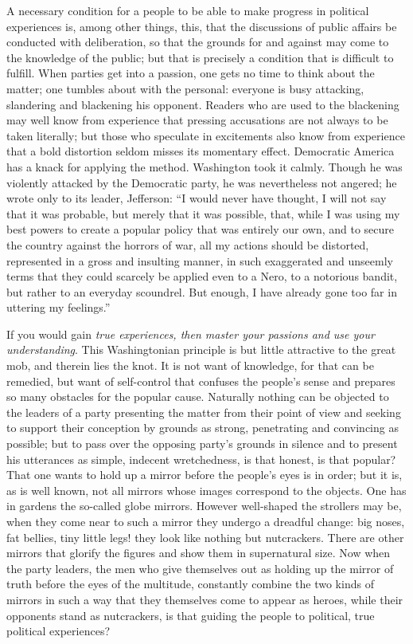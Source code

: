 \documentclass[12pt,a4paper,openany]{book}
\newcommand{\opage}[1]{\marginnote{\footnotesize\textit{[#1]}}}
\begin{document}
A necessary condition for a people to be able to make
progress in political experiences is, among other things, this,
that the discussions of public affairs be conducted
with deliberation, so that the grounds for and against may come
to the knowledge of the public; but that is precisely a condition
that is difficult to fulfill. When parties get
into a passion, one gets no time to think about the matter;
one tumbles about with the personal: everyone is busy
attacking, slandering and blackening his opponent.
Readers who are used to the blackening may well know %
from experience that pressing accusations are not
always to be taken literally; but those who speculate
in excitements also know from experience that a bold
distortion seldom misses its momentary effect.
Democratic America has a knack for applying the
method. Washington took it calmly. Though
he was violently attacked by the Democratic party,
he was nevertheless not angered; he wrote only to its leader,
Jefferson: ``I would never have thought, I will not
say that it was probable, but merely that it was possible,
that, while I was using my best powers to
create a popular policy that was entirely our own, and
to secure the country against the horrors of war, all my actions
should be distorted, represented in a
\setcounter{footnote}{0}%
\opage{48}gross and insulting manner, in such exaggerated and
unseemly terms that they could scarcely be applied
even to a Nero, to a notorious bandit, but rather
to an everyday scoundrel. But enough, I have
already gone too far in uttering my feelings.''

If you would gain \emph{true experiences, then master
your passions and use your understanding}. This
Washingtonian principle is but little attractive
to the great mob, and therein lies the knot. It is
not want of knowledge, for that can be remedied,
but want of self-control that confuses
the people's sense and prepares so many obstacles for the popular cause.
Naturally nothing can be objected to the
leaders of a party presenting the matter from their point of view
and seeking to support their conception by grounds as strong,
penetrating and convincing as possible; but
to pass over the opposing party's grounds in silence and to present his utterances
as simple, indecent wretchedness, is
that honest, is that popular? That one wants to hold up a mirror
before the people's eyes is in order; but it is, as is
well known, not all mirrors whose images correspond to the objects.
One has in gardens the so-called globe mirrors.
However well-shaped the strollers may be, when
they come near to such a mirror they undergo
a dreadful change: big noses, fat bellies,
tiny little legs! they look like nothing but nutcrackers.
There are other mirrors that glorify the figures and show
them in supernatural size. Now when the party leaders, the
men who give themselves out as holding up the mirror of truth
before the eyes of the multitude, constantly combine the two kinds of
mirrors in such a way that they themselves come to appear as
heroes, while their opponents stand as
\setcounter{footnote}{0}%
\opage{49}nutcrackers, is that guiding the people to political,
true political experiences?
\end{document}
